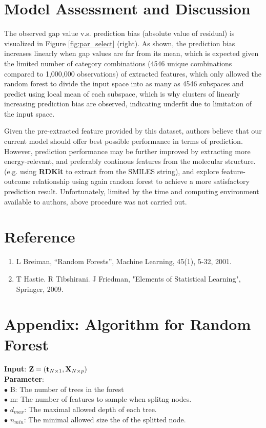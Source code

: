 \documentclass[11pt]{article}
\theoremstyle{definition}
\begin{document}
\newpage
\section{\textbf{Model Assessment and Discussion}}
The observed gap value v.s. prediction bias (absolute value of residual) is visualized in Figure \ref{fig:par_select} (right). As shown, the prediction bias increases linearly when gap values are far from its mean, which is expected given the limited number of category combinations (4546 unique combinations compared to 1,000,000 observations) of extracted features, which only allowed the random forest to divide the input space into as many as 4546 subspaces and predict using local mean of each subspace, which is why  clusters of linearly increasing prediction bias are observed, indicating underfit due to limitation of the input space.

Given the pre-extracted feature provided by this dataset, authors believe that  our current model should offer best possible performance in terms of prediction. However, prediction performance may be further improved by extracting more energy-relevant, and preferably continous features from the molecular structure. (e.g. using \textbf{RDKit} to extract from the SMILES string), and explore feature-outcome relationship  using again random forest to achieve a more satisfactory prediction result. Unfortunately, limited by the time and computing environment available to authors, above procedure was not carried out.

\clearpage
\section*{\textbf{Reference}}
\begin{enumerate}
\item L Breiman, “Random Forests”, Machine Learning, 45(1), 5-32, 2001. 
\item T Hastie. R Tibshirani. J Friedman, "Elements of Statistical Learning", Springer, 2009.
\end{enumerate}


\section*{\textbf{Appendix: Algorithm for Random Forest}}
\textbf{Input}: ${\bf Z} = ({\bf t}_{N \times 1}, {\bf X}_{N \times p})$\\

\textbf{Parameter}:\\
$\bullet$ B: The number of trees in the forest\\
$\bullet$ m: The number of features to sample when splitng nodes.\\
$\bullet$ $d_{max}$: The maximal allowed depth of each tree. \\
$\bullet$ $n_{min}$: The minimal allowed size the of the splitted node.\\
\end{document}
